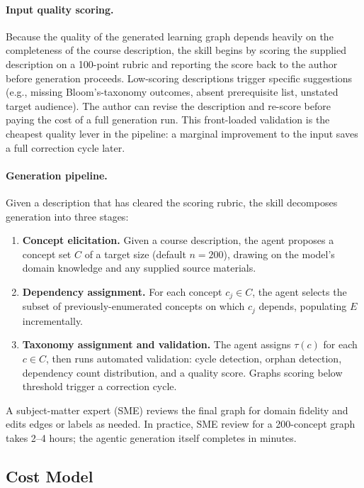 \paragraph{Input quality scoring.}
Because the quality of the generated learning graph depends heavily on
the completeness of the course description, the skill begins by scoring
the supplied description on a 100-point rubric and reporting the score
back to the author before generation proceeds. Low-scoring descriptions
trigger specific suggestions (e.g., missing Bloom's-taxonomy outcomes,
absent prerequisite list, unstated target audience). The author can
revise the description and re-score before paying the cost of a full
generation run. This front-loaded validation is the cheapest quality
lever in the pipeline: a marginal improvement to the input saves a full
correction cycle later.

\paragraph{Generation pipeline.}
Given a description that has cleared the scoring rubric, the skill
decomposes generation into three stages:
\begin{enumerate}
  \item \textbf{Concept elicitation.} Given a course description, the
    agent proposes a concept set $C$ of a target size (default $n=200$),
    drawing on the model's domain knowledge and any supplied source
    materials.
  \item \textbf{Dependency assignment.} For each concept $c_j \in C$, the
    agent selects the subset of previously-enumerated concepts on which
    $c_j$ depends, populating $E$ incrementally.
  \item \textbf{Taxonomy assignment and validation.} The agent assigns
    $\tau(c)$ for each $c \in C$, then runs automated validation: cycle
    detection, orphan detection, dependency count distribution, and a
    quality score. Graphs scoring below threshold trigger a correction
    cycle.
\end{enumerate}

A subject-matter expert (SME) reviews the final graph for domain fidelity
and edits edges or labels as needed. In practice, SME review for a
200-concept graph takes 2--4 hours; the agentic generation itself
completes in minutes.

\subsection{Cost Model}\label{sec:lg-cost}

